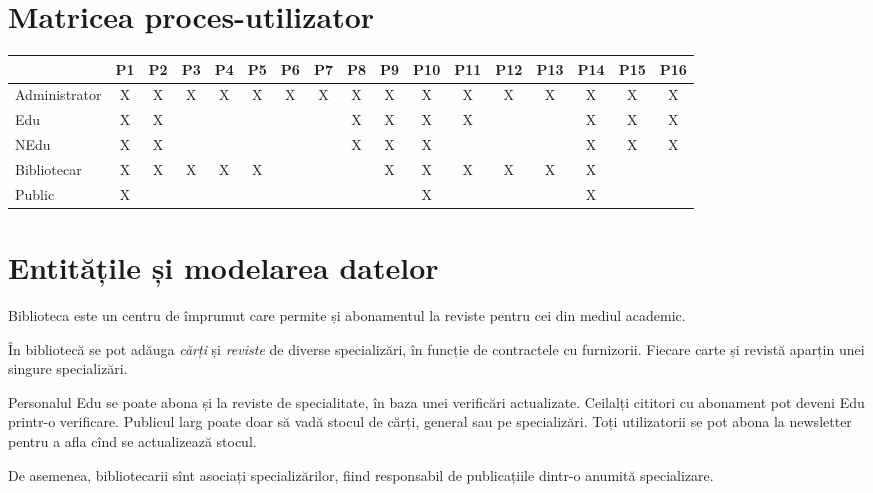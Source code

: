 
\section{Matricea proces-utilizator}
\label{sec:matrice-pu}

\begin{center}
  \small
  \begin{tabular}{|l|c|c|c|c|c|c|c|c|c|c|c|c|c|c|c|c|}
    \hline
    & P1 & P2 & P3 & P4 & P5 & P6 & P7 & P8 & P9 & P10 & P11 & P12 & P13 & P14 & P15 & P16 \\
    \hline \hline
    Administrator & X & X & X & X & X & X & X & X & X & X & X & X & X & X & X & X \\
    \hline
    Edu & X & X & & & & & & X & X & X & X & & & X & X & X \\
    \hline
    NEdu & X & X & & & & & & X & X & X & & & & X & X & X \\
    \hline
    Bibliotecar & X & X & X & X & X & & & & X & X & X & X & X & X & & \\
    \hline
    Public & X & & & & & & & & & X & & & & X & & \\
    \hline
  \end{tabular}
\end{center}


\section{Entitățile și modelarea datelor}
\label{sec:ent-model}

Biblioteca este un centru de împrumut care permite și abonamentul la reviste
pentru cei din mediul academic.

În bibliotecă se pot adăuga \emph{cărți} și \emph{reviste} de diverse
specializări, în funcție de contractele cu furnizorii. Fiecare
carte și revistă aparțin unei singure specializări.

Personalul Edu se poate abona și la reviste de specialitate, în baza
unei verificări actualizate. Ceilalți cititori cu abonament pot deveni
Edu printr-o verificare. Publicul larg poate doar să vadă stocul
de cărți, general sau pe specializări. Toți utilizatorii se pot abona
la newsletter pentru a afla cînd se actualizează stocul.

De asemenea, bibliotecarii sînt asociați specializărilor, fiind
responsabil de publicațiile dintr-o anumită specializare.

